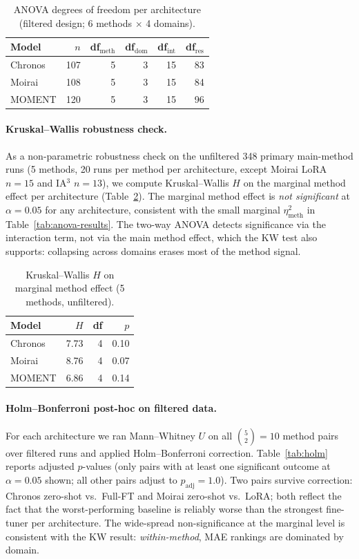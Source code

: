 \begin{table}[ht]
\centering
\caption{ANOVA degrees of freedom per architecture (filtered design; 6 methods $\times$ 4 domains).}
\label{tab:anova-dof}
\small
\begin{tabular}{lrrrrr}
\toprule
Model & $n$ & df$_{\text{meth}}$ & df$_{\text{dom}}$ & df$_{\text{int}}$ & df$_{\text{res}}$ \\
\midrule
Chronos & 107 & 5 & 3 & 15 & 83 \\
Moirai  & 108 & 5 & 3 & 15 & 84 \\
MOMENT  & 120 & 5 & 3 & 15 & 96 \\
\bottomrule
\end{tabular}
\end{table}

\paragraph{Kruskal--Wallis robustness check.} As a non-parametric robustness check on the unfiltered 348 primary main-method runs (5 methods, 20 runs per method per architecture, except Moirai LoRA $n{=}15$ and IA$^3$ $n{=}13$), we compute Kruskal--Wallis $H$ on the marginal method effect per architecture (Table~\ref{tab:kw}). The marginal method effect is \emph{not significant} at $\alpha=0.05$ for any architecture, consistent with the small marginal $\eta^2_{\text{meth}}$ in Table~\ref{tab:anova-results}. The two-way ANOVA detects significance via the interaction term, not via the main method effect, which the KW test also supports: collapsing across domains erases most of the method signal.

\begin{table}[ht]
\centering
\caption{Kruskal--Wallis $H$ on marginal method effect (5 methods, unfiltered).}
\label{tab:kw}
\small
\begin{tabular}{lrrr}
\toprule
Model & $H$ & df & $p$ \\
\midrule
Chronos & 7.73 & 4 & 0.10 \\
Moirai  & 8.76 & 4 & 0.07 \\
MOMENT  & 6.86 & 4 & 0.14 \\
\bottomrule
\end{tabular}
\end{table}

\paragraph{Holm--Bonferroni post-hoc on filtered data.} For each architecture we ran Mann--Whitney $U$ on all $\binom{5}{2}=10$ method pairs over filtered runs and applied Holm--Bonferroni correction. Table~\ref{tab:holm} reports adjusted $p$-values (only pairs with at least one significant outcome at $\alpha=0.05$ shown; all other pairs adjust to $p_{\text{adj}}=1.0$). Two pairs survive correction: Chronos zero-shot vs.\ Full-FT and Moirai zero-shot vs.\ LoRA; both reflect the fact that the worst-performing baseline is reliably worse than the strongest fine-tuner per architecture. The wide-spread non-significance at the marginal level is consistent with the KW result: \emph{within-method}, MAE rankings are dominated by domain.


